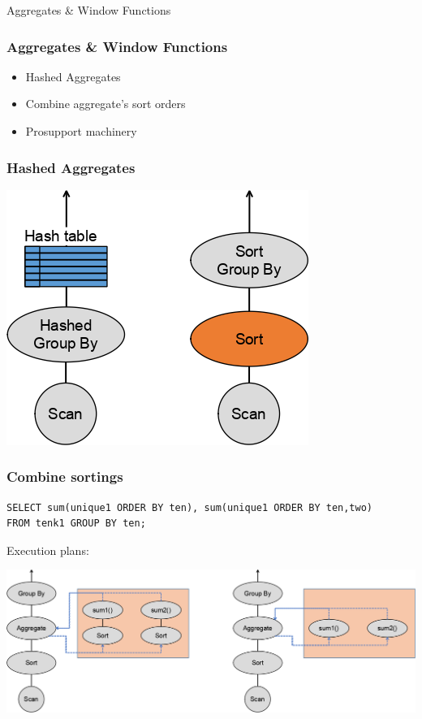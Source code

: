 \documentclass{beamer}
\begin{document}

\begin{frame}
\vspace*{\fill}
\begin{center}
Aggregates \& Window Functions
\end{center}
\vspace*{\fill}
\end{frame}

\begin{frame}[fragile]\frametitle{Aggregates \& Window Functions}
\begin{itemize}
  \item Hashed Aggregates
  \item Combine aggregate's sort orders
  \item Prosupport machinery
\end{itemize}
\end{frame}

\begin{frame}[fragile]\frametitle{Hashed Aggregates}
  \centerline{\includegraphics[scale=0.7]{pics/hashed_groupby.png}}
\end{frame}

\begin{frame}[fragile]\frametitle{Combine sortings}
\begin{lstlisting}[basicstyle=\tiny]
SELECT sum(unique1 ORDER BY ten), sum(unique1 ORDER BY ten,two)
FROM tenk1 GROUP BY ten;
\end{lstlisting}
Execution plans:
  \centerline{\includegraphics[scale=0.35]{pics/aggsort.png}}
\end{frame}
\end{document}
